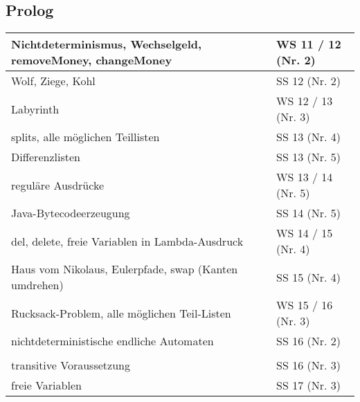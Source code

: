 \subsection*{Prolog}
\begin{table}[h]
	\centering
	\begin{tabular}{l|l}
		Nichtdeterminismus, Wechselgeld, removeMoney, changeMoney
		& WS 11 / 12  (Nr. 2)\\ \hline
				
		Wolf, Ziege, Kohl
		& SS 12 (Nr. 2)\\ \hline
		
		Labyrinth
		& WS 12 / 13 (Nr. 3)\\ \hline
		
		splits, alle möglichen Teillisten
		& SS 13 (Nr. 4)\\ \hline
		
		Differenzlisten
		& SS 13 (Nr. 5)\\ \hline
		
		reguläre Ausdrücke
		& WS 13 / 14 (Nr. 5) \\ \hline
		
		Java-Bytecodeerzeugung
		& SS 14 (Nr. 5) \\ \hline
		
		del, delete, freie Variablen in Lambda-Ausdruck
		& WS 14 / 15 (Nr. 4) \\ \hline
		
		Haus vom Nikolaus, Eulerpfade, swap (Kanten umdrehen)
		& SS 15 (Nr. 4) \\ \hline
		
		Rucksack-Problem, alle möglichen Teil-Listen
		& WS 15 / 16 (Nr. 3) \\ \hline
		
		nichtdeterministische endliche Automaten
		& SS 16 (Nr. 2) \\ \hline
		
		\multlineTable{Noten-Datenbank, Campus-Verwaltungssystem,\\ transitive Voraussetzung}
		& SS 16 (Nr. 3) \\ \hline
		
		freie Variablen
		& SS 17 (Nr. 3) \\ \hline
	\end{tabular}
\end{table}
\FloatBarrier
\newpage

